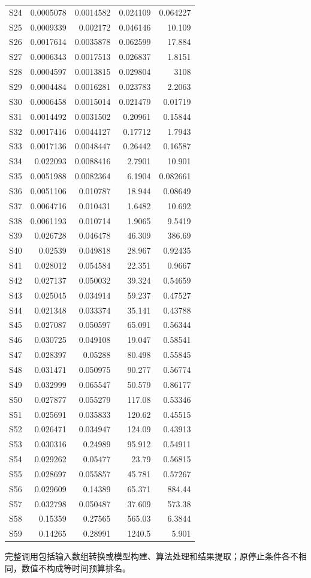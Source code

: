 {\begin{longtable}{lrrrr}
S24 & 0.0005078 & 0.0014582 & 0.024109 & 0.064227\\
S25 & 0.0009339 & 0.002172 & 0.046146 & 10.109\\
S26 & 0.0017614 & 0.0035878 & 0.062599 & 17.884\\
S27 & 0.0006343 & 0.0017513 & 0.026837 & 1.8151\\
S28 & 0.0004597 & 0.0013815 & 0.029804 & 3108\\
S29 & 0.0004484 & 0.0016281 & 0.023783 & 2.2063\\
S30 & 0.0006458 & 0.0015014 & 0.021479 & 0.01719\\
S31 & 0.0014492 & 0.0031502 & 0.20961 & 0.15844\\
S32 & 0.0017416 & 0.0044127 & 0.17712 & 1.7943\\
S33 & 0.0017136 & 0.0048447 & 0.26442 & 0.16587\\
S34 & 0.022093 & 0.0088416 & 2.7901 & 10.901\\
S35 & 0.0051988 & 0.0082364 & 6.1904 & 0.082661\\
S36 & 0.0051106 & 0.010787 & 18.944 & 0.08649\\
S37 & 0.0064716 & 0.010431 & 1.6482 & 10.692\\
S38 & 0.0061193 & 0.010714 & 1.9065 & 9.5419\\
S39 & 0.026728 & 0.046478 & 46.309 & 386.69\\
S40 & 0.02539 & 0.049818 & 28.967 & 0.92435\\
S41 & 0.028012 & 0.054584 & 22.351 & 0.9667\\
S42 & 0.027137 & 0.050032 & 39.324 & 0.54659\\
S43 & 0.025045 & 0.034914 & 59.237 & 0.47527\\
S44 & 0.021348 & 0.033374 & 35.141 & 0.43788\\
S45 & 0.027087 & 0.050597 & 65.091 & 0.56344\\
S46 & 0.030725 & 0.049108 & 19.047 & 0.58541\\
S47 & 0.028397 & 0.05288 & 80.498 & 0.55845\\
S48 & 0.031471 & 0.050975 & 90.277 & 0.56774\\
S49 & 0.032999 & 0.065547 & 50.579 & 0.86177\\
S50 & 0.027877 & 0.055279 & 117.08 & 0.53346\\
S51 & 0.025691 & 0.035833 & 120.62 & 0.45515\\
S52 & 0.026471 & 0.034947 & 124.09 & 0.43913\\
S53 & 0.030316 & 0.24989 & 95.912 & 0.54911\\
S54 & 0.029262 & 0.05477 & 23.79 & 0.56815\\
S55 & 0.028697 & 0.055857 & 45.781 & 0.57267\\
S56 & 0.029609 & 0.14389 & 65.371 & 884.44\\
S57 & 0.032798 & 0.050487 & 37.609 & 573.38\\
S58 & 0.15359 & 0.27565 & 565.03 & 6.3844\\
S59 & 0.14265 & 0.28991 & 1240.5 & 5.901\\
\end{longtable}
}
完整调用包括输入数组转换或模型构建、算法处理和结果提取；原停止条件各不相同，数值不构成等时间预算排名。
